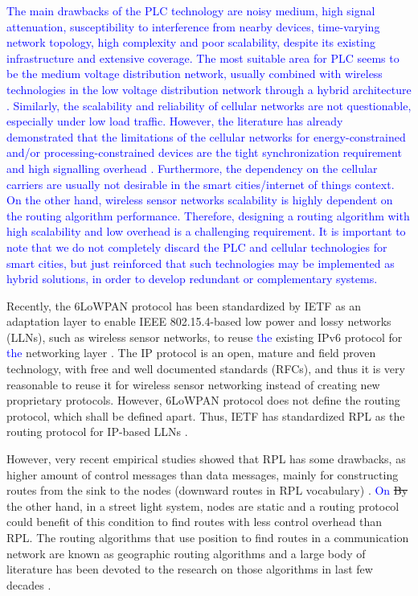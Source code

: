 \documentclass[authoryear,preprint,review,12pt]{elsarticle}
\newcommand{\rev}{\textcolor{blue}}
\begin{document}
\rev{The main drawbacks of the PLC technology are noisy medium, high signal attenuation, susceptibility to interference from nearby devices, time-varying network topology, high complexity and poor scalability, despite its existing infrastructure and extensive coverage. The most suitable area for PLC seems to be the medium voltage distribution network, usually combined with wireless technologies in the low voltage distribution network through a hybrid architecture \citep{PLC_drawbacks}. Similarly, the scalability and reliability of cellular networks are not questionable, especially under low load traffic. However, the literature has already demonstrated that the limitations of the cellular networks for energy-constrained and/or processing-constrained devices are the tight synchronization requirement and high signalling overhead \citep{celullar_iot}. Furthermore, the dependency on the cellular carriers are usually not desirable in the smart cities/internet of things context. On the other hand, wireless sensor networks scalability is highly dependent on the routing algorithm performance. Therefore, designing a routing algorithm with high scalability and low overhead is a challenging requirement. It is important to note that we do not completely discard the PLC and cellular technologies for smart cities, but just reinforced that such technologies may be implemented as hybrid solutions, in order to develop redundant or complementary systems.}


Recently, the 6LoWPAN protocol has been standardized by IETF as an adaptation layer to enable IEEE 802.15.4-based low power and lossy networks (LLNs), such as wireless sensor networks, to reuse \rev{the} existing IPv6 protocol for \rev{the} networking layer \citep{RFC4944}. The IP protocol is an open, mature and field proven technology, with free and well documented standards (RFCs), and thus it is very reasonable to reuse it for wireless sensor networking instead of creating new proprietary protocols. However, 6LoWPAN protocol does not define the routing protocol, which shall be defined apart. Thus, IETF has standardized RPL as the routing protocol for IP-based LLNs \citep{RFC6550}.

However, very recent empirical studies showed that RPL has some drawbacks, as higher amount of control messages than data messages, mainly for constructing routes from the sink to the nodes (downward routes in RPL vocabulary) \citep{Heurtefeux_RPL_2013,P2P_analysis_2010,P2P-RPL_2011}. \rev{On} \sout{By} the other hand, in a street light system, nodes are static and a routing protocol could benefit of this condition to find routes with less control overhead than RPL. The routing algorithms that use position to find routes in a communication network are known as geographic routing algorithms and a large body of literature has been devoted to the research on those algorithms in last few decades \citep{Karp_GPSR_2000, Position_Based_Routing_Ad_Hoc_2001, On_Optimal_Geographic_Routing_2007, Denardin2011}.
\end{document}
